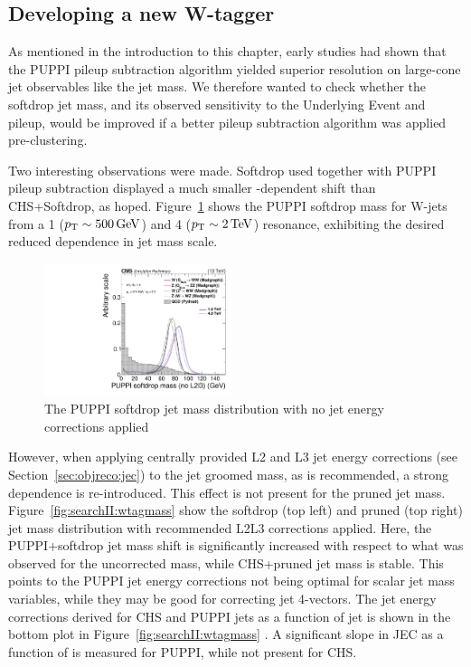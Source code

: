 \clearpage
\subsection{Developing a new W-tagger}
\label{sec:searchII:puppisoftdrop}
As mentioned in the introduction to this chapter, early studies had shown that the PUPPI pileup subtraction algorithm yielded superior resolution on large-cone jet observables like the jet mass. We therefore wanted to check whether the softdrop jet mass, and its observed sensitivity to the Underlying Event and pileup, would be improved if a better pileup subtraction algorithm was applied pre-clustering.\par
Two interesting observations were made. Softdrop used together with PUPPI pileup subtraction displayed a much smaller \PT-dependent shift than CHS+Softdrop, as hoped. Figure~\ref{fig:searchII:sdmass} shows the PUPPI softdrop mass for W-jets from a 1 \TeV ($p_{\mathrm{T}}\sim 500 \,\text{Ge\hspace{-.08em}V}$) and 4 \TeV ($p_{\mathrm{T}}\sim 2 \,\text{Te\hspace{-.08em}V}$) resonance, exhibiting the desired reduced \PT dependence in jet mass scale. 
\begin{figure}[h!]
\centering
\includegraphics[width=0.49\textwidth]{figures/analysis/search2/AN-16-235/plots/gen_SoftdropMassUnCorr.pdf}
\caption{The  PUPPI softdrop jet mass distribution with no jet energy corrections applied}
\label{fig:searchII:sdmass}
\end{figure}
However, when applying centrally provided L2 and L3 jet energy corrections (see Section~\ref{sec:objreco:jec}) to the jet groomed mass, as is recommended, a strong \PT dependence is re-introduced. This effect is not present for the pruned jet mass. Figure~\ref{fig:searchII:wtagmass} show the softdrop (top left) and pruned (top right) jet mass distribution with recommended L2L3 corrections applied. Here, the PUPPI+softdrop jet mass shift is significantly increased with respect to what was observed for the uncorrected mass, while CHS+pruned jet mass is stable. This points to the PUPPI jet energy corrections not being optimal for scalar jet mass variables, while they may be good for correcting jet 4-vectors. The jet energy corrections derived for CHS and PUPPI jets as a function of jet \PT is shown in the bottom plot in Figure~\ref{fig:searchII:wtagmass} . A significant slope in JEC as a function of \PT is measured for PUPPI, while not present for CHS.

